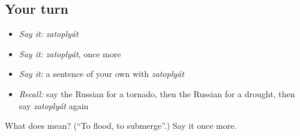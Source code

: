 \subsection*{Your turn}
\begin{itemize}
\raggedright
  \item \emph{Say it:} \emph{zatoplyát}
  \item \emph{Say it:} \emph{zatoplyát}, once more
  \item \emph{Say it:} a sentence of your own with \emph{zatoplyát}
  \item \emph{Recall:} say the Russian for a tornado, then the Russian for a drought, then say \emph{zatoplyát} again
\end{itemize}

\begin{tcolorbox}[breakable,colback=teal!4,colframe=teal!35!black,title={Before you move on}]
What does  mean? (\textquotedblleft{}To flood, to submerge\textquotedblright{}.) Say it once more.
\end{tcolorbox}
